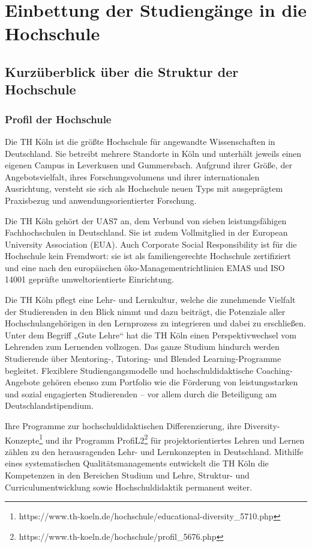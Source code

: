 \chapter{Einbettung der Studiengänge in die
Hochschule}\label{einbettung-der-studienguxe4nge-in-die-hochschule}

\section{Kurzüberblick über die Struktur der
Hochschule}\label{kurzuxfcberblick-uxfcber-die-struktur-der-hochschule}

\subsection{Profil der Hochschule}\label{profil-der-hochschule}

Die TH Köln ist die größte Hochschule für angewandte Wissenschaften in
Deutschland. Sie betreibt mehrere Standorte in Köln und unterhält
jeweils einen eigenen Campus in Leverkusen und Gummersbach. Aufgrund
ihrer Größe, der Angebotsvielfalt, ihres Forschungsvolumens und ihrer
internationalen Ausrichtung, versteht sie sich als Hochschule neuen Typs
mit ausgeprägtem Praxisbezug und anwendungsorientierter Forschung.

Die TH Köln gehört der UAS7 an, dem Verbund von sieben leistungsfähigen
Fachhochschulen in Deutschland. Sie ist zudem Vollmitglied in der
European University Association (EUA). Auch Corporate Social
Responsibility ist für die Hochschule kein Fremdwort: sie ist als
familiengerechte Hochschule zertifiziert und eine nach den europäischen
öko-Managementrichtlinien EMAS und ISO 14001 geprüfte umweltorientierte
Einrichtung.

Die TH Köln pflegt eine Lehr- und Lernkultur, welche die zunehmende
Vielfalt der Studierenden in den Blick nimmt und dazu beiträgt, die
Potenziale aller Hochschulangehörigen in den Lernprozess zu integrieren
und dabei zu erschließen. Unter dem Begriff „Gute Lehre`` hat die TH
Köln einen Perspektivwechsel vom Lehrenden zum Lernenden vollzogen. Das
ganze Studium hindurch werden Studierende über Mentoring-, Tutoring- und
Blended Learning-Programme begleitet. Flexiblere Studiengangsmodelle und
hochschuldidaktische Coaching-Angebote gehören ebenso zum Portfolio wie
die Förderung von leistungsstarken und sozial engagierten Studierenden
-- vor allem durch die Beteiligung am Deutschlandstipendium.

Ihre Programme zur hochschuldidaktischen Differenzierung, ihre
Diversity-Konzepte\footnote{https://www.th-koeln.de/hochschule/educational-diversity\_5710.php}
und ihr Programm ProfiL2\footnote{https://www.th-koeln.de/hochschule/profil\_5676.php}
für projektorientiertes Lehren und Lernen zählen zu den herausragenden
Lehr- und Lernkonzepten in Deutschland. Mithilfe eines systematischen
Qualitätsmanagements entwickelt die TH Köln die Kompetenzen in den
Bereichen Studium und Lehre, Struktur- und Curriculumentwicklung sowie
Hochschuldidaktik permanent weiter.

